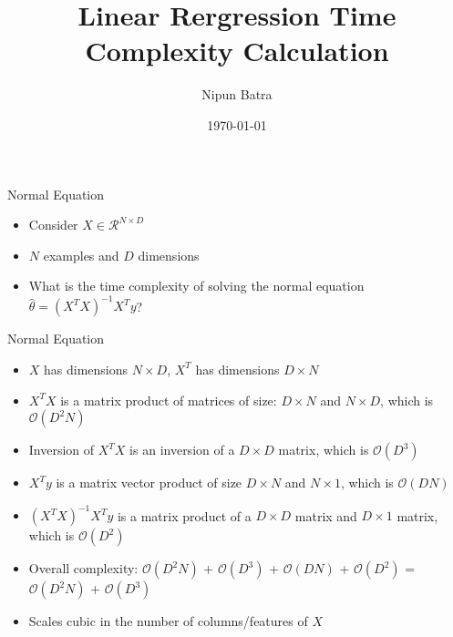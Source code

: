 \documentclass{beamer}
\title{Linear Rergression Time Complexity Calculation}
\date{\today}
\author{Nipun Batra}
\institute{IIT Gandhinagar}
\begin{document}
  \maketitle
  
  
  
  

\begin{frame}{Normal Equation}

	\begin{itemize}[<+->]
		\item Consider $X\in \mathcal{R}^{N\times D}$
		\item $N$ examples and $D$ dimensions
		\item What is the time complexity of solving the normal equation $\hat{\theta} = (X^TX)^{-1}X^Ty$?
	\end{itemize}
	
	

\end{frame}

\begin{frame}{Normal Equation}

\begin{itemize}[<+->]
	\item $X$ has dimensions $N\times D$, $X^T$ has dimensions $D \times N$
	\item $X^TX$ is a matrix product of matrices of size: $D \times N$ and $N \times D$, which is $\mathcal{O}(D^{2}N)$
	\item Inversion of $X^TX$ is an inversion of a $D\times D$ matrix, which is $\mathcal{O}(D^{3})$
	\item $X^Ty$ is a matrix vector product of size $D \times N$ and $N \times 1$, which is $\mathcal{O}(DN)$
	\item $(X^TX)^{-1}X^Ty$ is a matrix product of a  $D\times D$ matrix and $D \times 1$ matrix, which is $\mathcal{O}(D^2)$
	\item Overall complexity: $\mathcal{O}(D^{2}N)$ + $\mathcal{O}(D^{3})$ + $\mathcal{O}(DN)$ + $\mathcal{O}(D^2)$ = $\mathcal{O}(D^{2}N)$ + $\mathcal{O}(D^{3})$
	\item Scales cubic in the number of columns/features of $X$
\end{itemize}



\end{frame}
\end{document}
